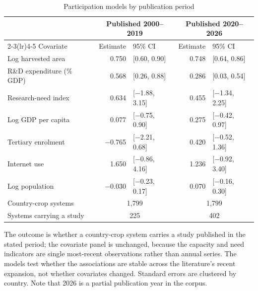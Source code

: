 \begin{table}[!t]
\centering
\footnotesize
\caption{Participation models by publication period}
\label{tab:periods}
\begin{tabular*}{\textwidth}{@{\extracolsep\fill}l r@{\hspace{6pt}}l r@{\hspace{6pt}}l@{}}
\toprule
& \multicolumn{2}{c}{Published 2000--2019} & \multicolumn{2}{c}{Published 2020--2026} \\
\cmidrule(lr){2-3}\cmidrule(lr){4-5}
Covariate & Estimate & 95\% CI & Estimate & 95\% CI \\
\midrule
Log harvested area & 0.750 & [0.60, 0.90] & 0.748 & [0.64, 0.86] \\
R\&D expenditure (\% GDP) & 0.568 & [0.26, 0.88] & 0.286 & [0.03, 0.54] \\
Research-need index & 0.634 & [$-$1.88, 3.15] & 0.455 & [$-$1.34, 2.25] \\
Log GDP per capita & 0.077 & [$-$0.75, 0.90] & 0.275 & [$-$0.42, 0.97] \\
Tertiary enrolment & $-$0.765 & [$-$2.21, 0.68] & 0.420 & [$-$0.52, 1.36] \\
Internet use & 1.650 & [$-$0.86, 4.16] & 1.236 & [$-$0.92, 3.40] \\
Log population & $-$0.030 & [$-$0.23, 0.17] & 0.070 & [$-$0.16, 0.30] \\
\midrule
Country-crop systems & \multicolumn{2}{c}{1,799} & \multicolumn{2}{c}{1,799} \\
Systems carrying a study & \multicolumn{2}{c}{225} & \multicolumn{2}{c}{402} \\
\bottomrule
\end{tabular*}
\begin{tablenotes}
\item[] The outcome is whether a country-crop system carries a study published in the stated period; the covariate panel is unchanged, because the capacity and need indicators are single most-recent observations rather than annual series. The models test whether the associations are stable across the literature's recent expansion, not whether covariates changed. Standard errors are clustered by country. Note that 2026 is a partial publication year in the corpus.
\end{tablenotes}
\end{table}
